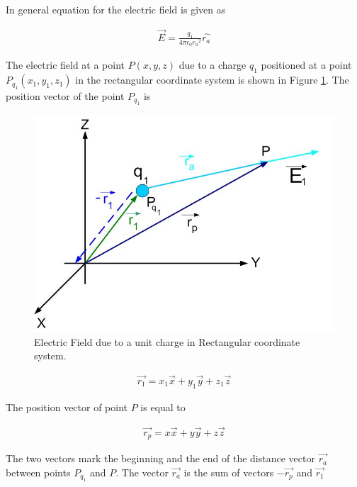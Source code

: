 \documentclass{ximera}
\begin{document}
In general equation for the electric field is given as



\begin{eqnarray}
\vec{E}=\frac{q_1}{4 \pi \epsilon_{0} {r_a}^2} \hat{r_a} \label{genfield}
\end{eqnarray}

The electric field at a point $P(x,y,z)$ due to a charge $q_1$ positioned at a point $P_{q_1}(x_1, y_1, z_1 )$  in the rectangular coordinate system is shown in Figure \ref{singlecharge}. The position vector of the point $P_{q_1}$  is 


\begin{figure}[htbp]
\begin{center}
\includegraphics[scale=0.5]{../jpg/singlechargecartcoord.jpg}
\end{center}
\caption{Electric Field due to a unit charge in Rectangular coordinate system.}
\label{singlecharge}
\end{figure}





\begin{eqnarray}
\vec{r_1}=x_1 \vec{x} + y_1 \vec{y} +z_1 \vec{z}
\end{eqnarray}

The position vector of point $P$ is equal to

\begin{eqnarray}
\vec{r_p}=x\vec{x} + y \vec{y} +z \vec{z}
\end{eqnarray}

The two vectors mark the beginning and the end of the distance vector $\vec{r_a}$  between points $P_{q_1}$ and $P$. The vector  $\vec{r_a}$ is the sum of vectors $-\vec{r_p}$ and $\vec{r_1}$
\end{document}
